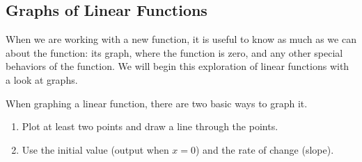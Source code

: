 %
%
%
%
%
%

\subsection{Graphs of Linear Functions}

When we are working with a new function, it is useful to know as much as we can about the function: its graph, where the function is zero, and any other special behaviors of the function. We will begin this exploration of linear functions with a look at graphs.

When graphing a linear function, there are two basic ways to graph it.

\begin{enumerate}
\item Plot at least two points and draw a line through the points.
\item Use the initial value (output when $x = 0$) and the rate of change (slope).
\end{enumerate}

